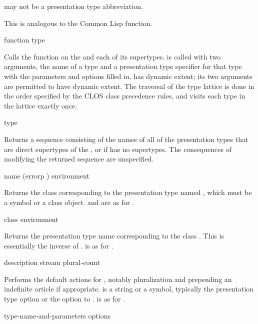  may not be a presentation type abbreviation.

This is analogous to the Common Lisp  function.


 {function type}

Calls the function  on the 
 and each of its supertypes.   is called with two
arguments, the name of a type and a presentation type specifier for that type
with the parameters and options filled in.   has dynamic extent;
its two arguments are permitted to have dynamic extent.  The traversal of the
type lattice is done in the order specified by the CLOS class precedence rules,
and visits each type in the lattice exactly once.


 {type}

Returns a sequence consisting of the names of all of the presentation types that
are direct supertypes of the  , or
 if  has no supertypes.  The consequences of modifying the
returned sequence are unspecified.


 {name \optional (errorp ) environment}

Returns the class corresponding to the presentation type named , which
must be a symbol or a class object.   and  are as
for .


 {class \optional environment}

Returns the presentation type name corresponding to the class .  This
is essentially the inverse of .
 is as for .


 {description stream plural-count}

Performs the default actions for , notably
pluralization and prepending an indefinite article if appropriate.
 is a string or a symbol, typically the 
presentation type option or the  option to
.   is as for
.


 {type-name-and-parameters \rest options}

